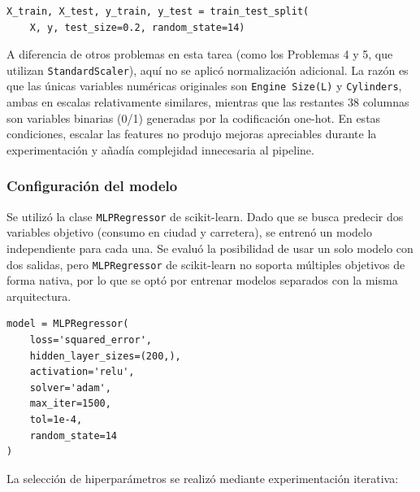 \documentclass{article}
\begin{document}
\begin{lstlisting}
X_train, X_test, y_train, y_test = train_test_split(
    X, y, test_size=0.2, random_state=14)
\end{lstlisting}

A diferencia de otros problemas en esta tarea (como los Problemas 4 y 5, que utilizan \texttt{StandardScaler}), aquí no se aplicó normalización adicional. La razón es que las únicas variables numéricas originales son \texttt{Engine Size(L)} y \texttt{Cylinders}, ambas en escalas relativamente similares, mientras que las restantes 38 columnas son variables binarias (0/1) generadas por la codificación one-hot. En estas condiciones, escalar las features no produjo mejoras apreciables durante la experimentación y añadía complejidad innecesaria al pipeline.

\subsubsection{Configuración del modelo}

Se utilizó la clase \texttt{MLPRegressor} de scikit-learn. Dado que se busca predecir dos variables objetivo (consumo en ciudad y carretera), se entrenó un modelo independiente para cada una. Se evaluó la posibilidad de usar un solo modelo con dos salidas, pero \texttt{MLPRegressor} de scikit-learn no soporta múltiples objetivos de forma nativa, por lo que se optó por entrenar modelos separados con la misma arquitectura.

\begin{lstlisting}
model = MLPRegressor(
    loss='squared_error',
    hidden_layer_sizes=(200,), 
    activation='relu', 
    solver='adam', 
    max_iter=1500, 
    tol=1e-4,
    random_state=14
)
\end{lstlisting}

La selección de hiperparámetros se realizó mediante experimentación iterativa:
\end{document}

